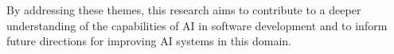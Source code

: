 By addressing these themes, this research aims to contribute to a deeper understanding of the capabilities of AI in software development and to inform future directions for improving AI systems in this domain.


